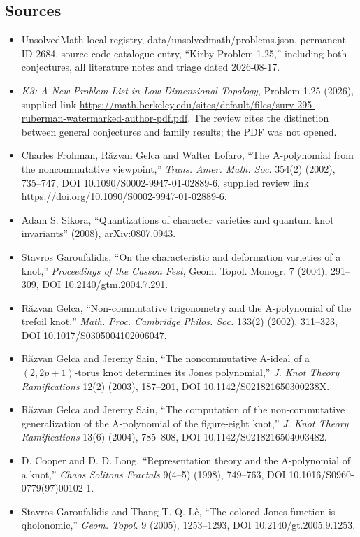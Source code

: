 \documentclass[11pt]{article}
\begin{document}
\subsection{Sources}
\begin{itemize}
\item UnsolvedMath local registry, data/unsolvedmath/problems.json, permanent ID 2684, source code catalogue entry, ``Kirby Problem 1.25,'' including both conjectures, all literature notes and triage dated 2026-08-17.
\item \emph{K3: A New Problem List in Low-Dimensional Topology}, Problem 1.25 (2026), supplied link \url{https://math.berkeley.edu/sites/default/files/surv-295-ruberman-watermarked-author-pdf.pdf}. The review cites the distinction between general conjectures and family results; the PDF was not opened.
\item [FGL02] Charles Frohman, Răzvan Gelca and Walter Lofaro, ``The A-polynomial from the noncommutative viewpoint,'' \emph{Trans. Amer. Math. Soc.} 354(2) (2002), 735--747, DOI 10.1090/S0002-9947-01-02889-6, supplied review link \url{https://doi.org/10.1090/S0002-9947-01-02889-6}.
\item [Sik08] Adam S. Sikora, ``Quantizations of character varieties and quantum knot invariants'' (2008), arXiv:0807.0943.
\item [Gar04] Stavros Garoufalidis, ``On the characteristic and deformation varieties of a knot,'' \emph{Proceedings of the Casson Fest}, Geom. Topol. Monogr. 7 (2004), 291--309, DOI 10.2140/gtm.2004.7.291.
\item [Gel02] Răzvan Gelca, ``Non-commutative trigonometry and the A-polynomial of the trefoil knot,'' \emph{Math. Proc. Cambridge Philos. Soc.} 133(2) (2002), 311--323, DOI 10.1017/S0305004102006047.
\item [GS03] Răzvan Gelca and Jeremy Sain, ``The noncommutative A-ideal of a $(2,2p+1)$-torus knot determines its Jones polynomial,'' \emph{J. Knot Theory Ramifications} 12(2) (2003), 187--201, DOI 10.1142/S021821650300238X.
\item [GS04] Răzvan Gelca and Jeremy Sain, ``The computation of the non-commutative generalization of the A-polynomial of the figure-eight knot,'' \emph{J. Knot Theory Ramifications} 13(6) (2004), 785--808, DOI 10.1142/S0218216504003482.
\item [CL98] D. Cooper and D. D. Long, ``Representation theory and the A-polynomial of a knot,'' \emph{Chaos Solitons Fractals} 9(4--5) (1998), 749--763, DOI 10.1016/S0960-0779(97)00102-1.
\item [GL05] Stavros Garoufalidis and Thang T. Q. Lê, ``The colored Jones function is qholonomic,'' \emph{Geom. Topol.} 9 (2005), 1253--1293, DOI 10.2140/gt.2005.9.1253.

\end{itemize}
\end{document}
